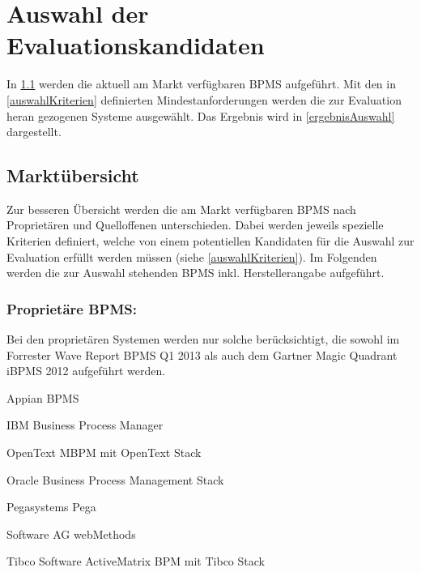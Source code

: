 \section{Auswahl der Evaluationskandidaten}
In \ref{marktübersicht} werden die aktuell am Markt verfügbaren \ac{BPMS} aufgeführt. Mit den in \ref{auswahlKriterien} definierten Mindestanforderungen werden die zur Evaluation heran gezogenen Systeme ausgewählt. Das Ergebnis wird in \ref{ergebnisAuswahl} dargestellt.


\subsection{Marktübersicht}
\label{marktübersicht}
Zur besseren Übersicht werden die am Markt verfügbaren \ac{BPMS} nach Proprietären und Quelloffenen unterschieden. Dabei werden jeweils spezielle Kriterien definiert, welche von einem potentiellen Kandidaten für die Auswahl zur Evaluation erfüllt werden müssen (siehe \ref{auswahlKriterien}). Im Folgenden werden die zur Auswahl stehenden \ac{BPMS} inkl. Herstellerangabe aufgeführt.


\subsubsection*{Proprietäre \ac{BPMS}:}
Bei den proprietären Systemen werden nur solche berücksichtigt, die sowohl im Forrester Wave Report BPMS Q1 2013 \cite{Forresterresearchinc.2013} als auch dem Gartner Magic Quadrant iBPMS 2012 \cite{Gartner.2012} aufgeführt werden.

\begin{compactitem}
	\item Appian BPMS
	\item IBM Business Process Manager
	\item OpenText MBPM mit OpenText Stack
	\item Oracle Business Process Management Stack
	\item Pegasystems Pega
	\item Software AG webMethods
	\item Tibco Software ActiveMatrix BPM mit Tibco Stack
\end{compactitem}

